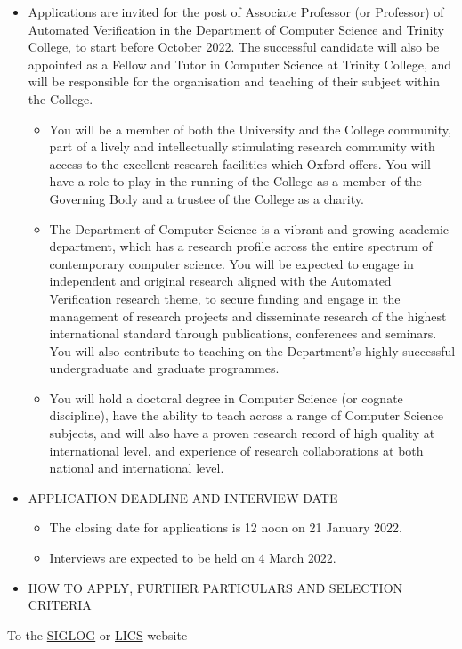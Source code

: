 \documentclass[prodmode,acmtecs]{acmsmall} %
\begin{document}
\begin{itemize}\item  Applications are invited for the post of Associate Professor (or Professor) of Automated Verification in the Department of Computer Science and Trinity College, to start before October 2022. The successful candidate will also be appointed as a Fellow and Tutor in Computer Science at Trinity College, and will be responsible for the organisation and teaching of their subject within the College. 
 
\begin{itemize}\item  You will be a member of both the University and the College community, part of a lively and intellectually stimulating research community with access to the excellent research facilities which Oxford offers. You will have a role to play in the running of the College as a member of the Governing Body and a trustee of the College as a charity. 
\item  The Department of Computer Science is a vibrant and growing academic department, which has a research profile across the entire spectrum of contemporary computer science.  You will be expected to engage in independent and original research aligned with the Automated Verification research theme, to secure funding and engage in the management of research projects and disseminate research of the highest international standard through publications, conferences and seminars.  You will also contribute to teaching on the Department’s highly successful undergraduate and graduate programmes.
\item  You will hold a doctoral degree in Computer Science (or cognate discipline), have the ability to teach across a range of Computer Science subjects, and will also have a proven research record of high quality at international level, and experience of research collaborations at both national and international level.
\end{itemize} 
\item  APPLICATION DEADLINE AND INTERVIEW DATE  
 
\begin{itemize}\item  The closing date for applications is 12 noon on 21 January 2022.
\item  Interviews are expected to be held on 4 March 2022.
\end{itemize} 
\item  HOW TO APPLY, FURTHER PARTICULARS AND SELECTION CRITERIA 
 
\end{itemize}


To the \href{http://siglog.org/}{SIGLOG} or \href{https://lics.siglog.org}{LICS} website
\end{document}
